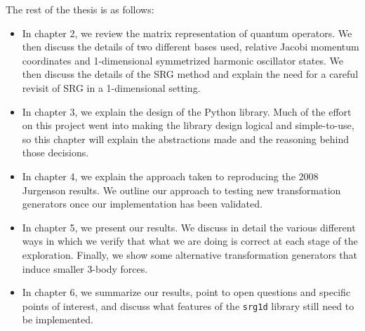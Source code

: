 The rest of the thesis is as follows:
\begin{itemize}
    \item{In chapter 2, we review the matrix representation of quantum operators. We then discuss the details of two different bases used, relative Jacobi momentum coordinates and 1-dimensional symmetrized harmonic oscillator states. We then discuss the details of the SRG method and explain the need for a careful revisit of SRG in a 1-dimensional setting.}
    \item{In chapter 3, we explain the design of the Python library. Much of the effort on this project went into making the library design logical and simple-to-use, so this chapter will explain the abstractions made and the reasoning behind those decisions.}
    \item{In chapter 4, we explain the approach taken to reproducing the 2008 Jurgenson results. We outline our approach to testing new transformation generators once our implementation has been validated.}
    \item{In chapter 5, we present our results. We discuss in detail the various different ways in which we verify that what we are doing is correct at each stage of the exploration. Finally, we show some alternative transformation generators that induce smaller 3-body forces.}
    \item{In chapter 6, we summarize our results, point to open questions and specific points of interest, and discuss what features of the \texttt{srg1d} library still need to be implemented.}
\end{itemize}

